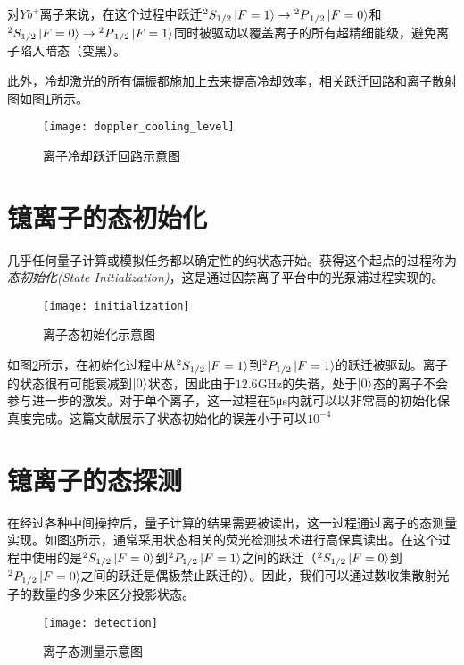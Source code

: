 对$Yb^+$离子来说，在这个过程中跃迁$^2S_{1/2}\ket{F=1}\to {^2P}_{1/2}\ket{F=0}$和$^2S_{1/2}\ket{F=0}\to {^2P}_{1/2}\ket{F=1}$同时被驱动以覆盖离子的所有超精细能级，避免离子陷入暗态（变黑）。

此外，冷却激光的所有偏振都施加上去来提高冷却效率，相关跃迁回路和离子散射图如图\ref{fig:doppler_cooling_level}所示。
\begin{figure}
    \centering
    \caption[离子冷却跃迁回路示意图]{离子冷却跃迁回路示意图\label{fig:doppler_cooling_level}}
    \texttt{[image: doppler\_cooling\_level]}
\end{figure}

\section[镱离子的态初始化]{镱离子的态初始化\label{section:yb_state_init}}

几乎任何量子计算或模拟任务都以确定性的纯状态开始。获得这个起点的过程称为\emph{态初始化(State Initialization)}，这是通过囚禁离子平台中的光泵浦过程实现的。

\begin{figure}
    \centering
    \caption[离子态初始化示意图]{离子态初始化示意图\label{fig:initialization}}
    \texttt{[image: initialization]}
\end{figure}

如图\ref{fig:initialization}所示，在初始化过程中从$^2S_{1/2}\ket{F=1}$到$^2P_{1/2}\ket{F=1}$的跃迁被驱动。离子的状态很有可能衰减到$\ket{0}$状态，因此由于$12.6$GHz的失谐，处于$\ket{0}$态的离子不会参与进一步的激发。对于单个离子，这一过程在$5$μs内就可以以非常高的初始化保真度完成。这篇\cite[]{Harty_Allcock_Ballance_Guidoni_Janacek_Linke_Stacey_Lucas_2014}文献展示了状态初始化的误差小于可以$10^{−4}$

\section[镱离子的态探测]{镱离子的态探测\label{section:yb_state_detection}}
在经过各种中间操控后，量子计算的结果需要被读出，这一过程通过离子的态测量实现。如图\ref{fig:detection}所示，通常采用状态相关的荧光检测技术进行高保真读出\cite[]{Blinov_Leibfried_Monroe_Wineland_2004}。在这个过程中使用的是$^2S_{1/2}\ket{F=0}$到$^2P_{1/2}\ket{F=1}$之间的跃迁（$^2S_{1/2}\ket{F=0}$到$^2P_{1/2}\ket{F=0}$之间的跃迁是偶极禁止跃迁的）。因此，我们可以通过数收集散射光子的数量的多少来区分投影状态。
\begin{figure}
    \centering
    \caption[离子态测量示意图]{离子态测量示意图\label{fig:detection}}
    \texttt{[image: detection]}
\end{figure}

